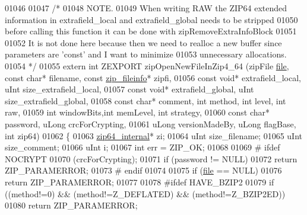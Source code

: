 \begin{DoxyCode}
01046 
01047 \textcolor{comment}{/*}
01048 \textcolor{comment}{ NOTE.}
01049 \textcolor{comment}{ When writing RAW the ZIP64 extended information in extrafield\_local and extrafield\_global needs to be
       stripped}
01050 \textcolor{comment}{ before calling this function it can be done with zipRemoveExtraInfoBlock}
01051 \textcolor{comment}{}
01052 \textcolor{comment}{ It is not done here because then we need to realloc a new buffer since parameters are 'const' and I want
       to minimize}
01053 \textcolor{comment}{ unnecessary allocations.}
01054 \textcolor{comment}{ */}
01055 \textcolor{keyword}{extern} \textcolor{keywordtype}{int} ZEXPORT zipOpenNewFileInZip4\_64 (zipFile \hyperlink{structfile}{file}, \textcolor{keyword}{const} \textcolor{keywordtype}{char}* filename, \textcolor{keyword}{const} 
      \hyperlink{structzip__fileinfo}{zip\_fileinfo}* zipfi,
01056                                          \textcolor{keyword}{const} \textcolor{keywordtype}{void}* extrafield\_local, uInt size\_extrafield\_local,
01057                                          \textcolor{keyword}{const} \textcolor{keywordtype}{void}* extrafield\_global, uInt size\_extrafield\_global,
01058                                          \textcolor{keyword}{const} \textcolor{keywordtype}{char}* comment, \textcolor{keywordtype}{int} method, \textcolor{keywordtype}{int} level, \textcolor{keywordtype}{int} raw,
01059                                          \textcolor{keywordtype}{int} windowBits,\textcolor{keywordtype}{int} memLevel, \textcolor{keywordtype}{int} strategy,
01060                                          \textcolor{keyword}{const} \textcolor{keywordtype}{char}* password, uLong crcForCrypting,
01061                                          uLong versionMadeBy, uLong flagBase, \textcolor{keywordtype}{int} zip64)
01062 \{
01063     \hyperlink{structzip64__internal}{zip64\_internal}* zi;
01064     uInt size\_filename;
01065     uInt size\_comment;
01066     uInt i;
01067     \textcolor{keywordtype}{int} err = ZIP\_OK;
01068 
01069 \textcolor{preprocessor}{#    ifdef NOCRYPT}
01070     (crcForCrypting);
01071     \textcolor{keywordflow}{if} (password != NULL)
01072         \textcolor{keywordflow}{return} ZIP\_PARAMERROR;
01073 \textcolor{preprocessor}{#    endif}
01074 
01075     \textcolor{keywordflow}{if} (\hyperlink{structfile}{file} == NULL)
01076         \textcolor{keywordflow}{return} ZIP\_PARAMERROR;
01077 
01078 \textcolor{preprocessor}{#ifdef HAVE\_BZIP2}
01079     \textcolor{keywordflow}{if} ((method!=0) && (method!=Z\_DEFLATED) && (method!=Z\_BZIP2ED))
01080       \textcolor{keywordflow}{return} ZIP\_PARAMERROR;

\end{DoxyCode}

